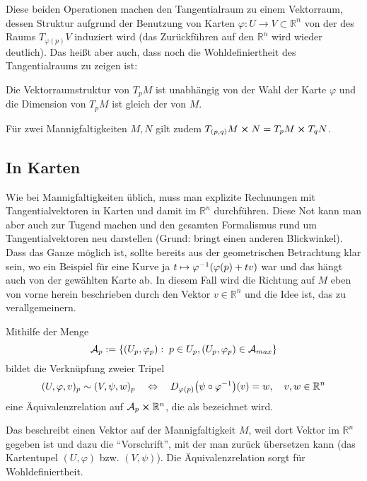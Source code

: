 \documentclass[../H_Analysis_main.tex]{subfiles}
\begin{document}
Diese beiden Operationen machen den Tangentialraum zu einem Vektorraum, dessen Struktur aufgrund der Benutzung von Karten $\varphi: U \rightarrow V \subset \mathbb{R}^n$ von der des Raums $T_{\varphi(p)} V$ induziert wird (das Zurückführen auf den $\mathbb{R}^n$ wird wieder deutlich). Das heißt aber auch, dass noch die Wohldefiniertheit des Tangentialraums zu zeigen ist:

\begin{satz}[Eigenschaften $T_p M$]
Die Vektorraumstruktur von $T_p M$ ist unabhängig von der Wahl der Karte $\varphi$ und die Dimension von $T_p M$ ist gleich der von $M$.

Für zwei Mannigfaltigkeiten $M, N$ gilt zudem $T_{(p, q)} M \cross N = T_p M \cross T_q N$.
\end{satz}




		\subsection{In Karten}
Wie bei Mannigfaltigkeiten üblich, muss man explizite Rechnungen mit Tangentialvektoren in Karten und damit im $\mathbb{R}^n$ durchführen. Diese Not kann man aber auch zur Tugend machen und den gesamten Formalismus rund um Tangentialvektoren neu darstellen (Grund: bringt einen anderen Blickwinkel). Dass das Ganze möglich ist, sollte bereits aus der geometrischen Betrachtung klar sein, wo ein Beispiel für eine Kurve ja $t \mapsto \varphi^{-1}\qty(\varphi(p) + t v)$ war und das hängt auch von der gewählten Karte ab. In diesem Fall wird die Richtung auf $M$ eben von vorne herein beschrieben durch den Vektor $v \in \mathbb{R}^n$ und die Idee ist, das zu verallgemeinern.

\begin{defi}
Mithilfe der Menge
\begin{equation}
\mathcal{A}_p := \qty{(U_p, \varphi_p): \; p \in U_p, (U_p, \varphi_p) \in \mathcal{A}_{max}}
\end{equation}
bildet die Verknüpfung zweier Tripel
\begin{equation}
(U, \varphi, v)_p \sim (V, \psi, w)_p \quad \Leftrightarrow \quad D_{\varphi(p)} \qty(\psi \circ \varphi^{-1})(v) = w, \quad v, w \in \mathbb{R}^n
\end{equation}
eine Äquivalenzrelation auf $\mathcal{A}_p \cross \mathbb{R}^n$, die als  bezeichnet wird.
\end{defi}
Das beschreibt einen Vektor auf der Mannigfaltigkeit $M$, weil dort Vektor im $\mathbb{R}^n$ gegeben ist und dazu die \enquote{Vorschrift}, mit der man zurück übersetzen kann (das Kartentupel $(U, \varphi)$ bzw. $(V, \psi)$). Die Äquivalenzrelation sorgt für Wohldefiniertheit.
\end{document}

